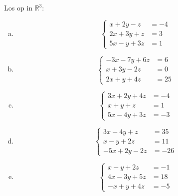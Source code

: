 \documentclass[12pt,twoside]{article}
\begin{document}
\begin{oefening}
Los op in $\mathbb{R}^3$:
\begin{multicols}{2}
\begin{enumerate}[(a)]
  \item$$\left\{
\begin{aligned}
  x + 2y -z &= -4\\
  2x+3y+z   &= 3\\
  5x-y+3z   &= 1
\end{aligned}\right.$$
  \item$$\left\{
\begin{aligned}
  -3x -7y +6z &= 6\\
  x+3y-2z   &= 0\\
  2x+y+4z   &= 25
\end{aligned}\right.$$
  \item$$\left\{
\begin{aligned}
  3x +2y +4z &= -4\\
  x+y+z   &= 1\\
  5x-4y+3z   &= -3
\end{aligned}\right.$$
  \item$$\left\{
\begin{aligned}
  3x -4y +z &= 35\\
  x-y+2z   &= 11\\
  -5x+2y-2z   &= -26
\end{aligned}\right.$$
  \item$$\left\{
\begin{aligned}
  x -y + 2z &= -1\\
  4x-3y+5z   &= 18\\
  -x+y+4z   &= -5
\end{aligned}\right.$$
\end{enumerate}
\end{multicols}
\end{oefening}
\end{document}
